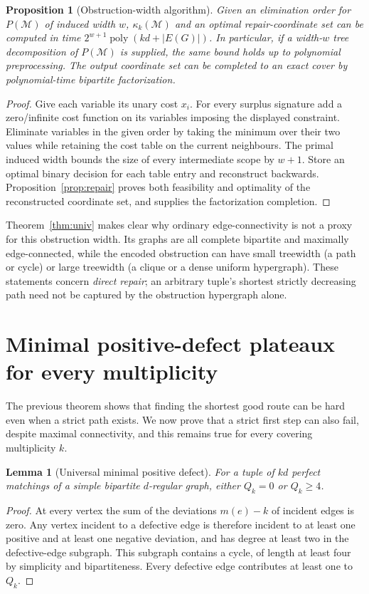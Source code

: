 \documentclass[10pt]{article}
\newtheorem{lemma}[theorem]{Lemma}
\newtheorem{proposition}[theorem]{Proposition}
\newcommand{\M}{\mathcal M}
\newcommand{\kc}{\kappa_k}
\begin{document}
\begin{proposition}[Obstruction-width algorithm]\label{prop:tw}
Given an elimination order for $P(\M)$ of induced width $w$, $\kc(\M)$ and an optimal repair-coordinate set can be computed in time $2^{w+1}\operatorname{poly}(kd+|E(G)|)$. In particular, if a width-$w$ tree decomposition of $P(\M)$ is supplied, the same bound holds up to polynomial preprocessing. The output coordinate set can be completed to an exact cover by polynomial-time bipartite factorization.
\end{proposition}
\begin{proof}
Give each variable its unary cost $x_i$. For every surplus signature add a zero/infinite cost function on its variables imposing the displayed constraint. Eliminate variables in the given order by taking the minimum over their two values while retaining the cost table on the current neighbours. The primal induced width bounds the size of every intermediate scope by $w+1$. Store an optimal binary decision for each table entry and reconstruct backwards. Proposition~\ref{prop:repair} proves both feasibility and optimality of the reconstructed coordinate set, and supplies the factorization completion.
\end{proof}
Theorem~\ref{thm:univ} makes clear why ordinary edge-connectivity is not a proxy for this obstruction width. Its graphs are all complete bipartite and maximally edge-connected, while the encoded obstruction can have small treewidth (a path or cycle) or large treewidth (a clique or a dense uniform hypergraph). These statements concern \emph{direct repair}; an arbitrary tuple's shortest strictly decreasing path need not be captured by the obstruction hypergraph alone.

\section{Minimal positive-defect plateaux for every multiplicity}
The previous theorem shows that finding the shortest good route can be hard even when a strict path exists. We now prove that a strict first step can also fail, despite maximal connectivity, and this remains true for every covering multiplicity $k$.

\begin{lemma}[Universal minimal positive defect]\label{lem:qfour}
For a tuple of $kd$ perfect matchings of a simple bipartite $d$-regular graph, either $Q_k=0$ or $Q_k\ge4$.
\end{lemma}
\begin{proof}
At every vertex the sum of the deviations $m(e)-k$ of incident edges is zero. Any vertex incident to a defective edge is therefore incident to at least one positive and at least one negative deviation, and has degree at least two in the defective-edge subgraph. This subgraph contains a cycle, of length at least four by simplicity and bipartiteness. Every defective edge contributes at least one to $Q_k$.
\end{proof}
\end{document}
